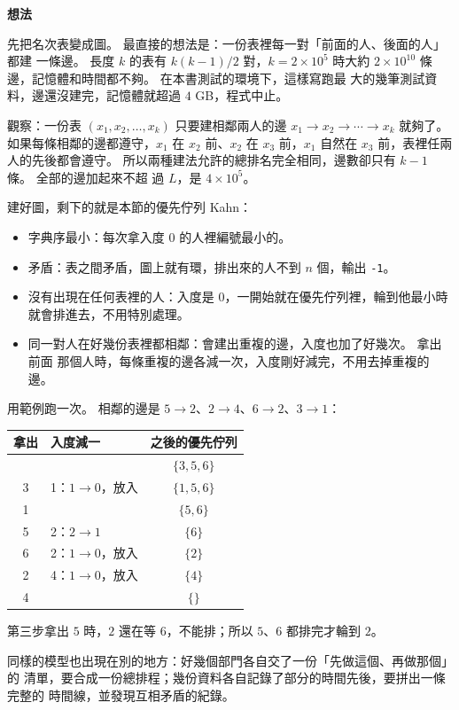 \textbf{想法}

先把名次表變成圖。 最直接的想法是：一份表裡每一對「前面的人、後面的人」都建
一條邊。 長度 $k$ 的表有 $k(k - 1)/2$ 對，$k = 2 \times 10^5$ 時大約
$2 \times 10^{10}$ 條邊，記憶體和時間都不夠。 在本書測試的環境下，這樣寫跑最
大的幾筆測試資料，邊還沒建完，記憶體就超過 $4$ GB，程式中止。

觀察：一份表 $(x_1, x_2, \ldots, x_k)$ 只要建相鄰兩人的邊
$x_1 \to x_2 \to \cdots \to x_k$ 就夠了。 如果每條相鄰的邊都遵守，$x_1$ 在
$x_2$ 前、$x_2$ 在 $x_3$ 前，$x_1$ 自然在 $x_3$ 前，表裡任兩人的先後都會遵守。
所以兩種建法允許的總排名完全相同，邊數卻只有 $k - 1$ 條。 全部的邊加起來不超
過 $L$，是 $4 \times 10^5$。

建好圖，剩下的就是本節的優先佇列 Kahn：

\begin{itemize}
\item 字典序最小：每次拿入度 $0$ 的人裡編號最小的。
\item 矛盾：表之間矛盾，圖上就有環，排出來的人不到 $n$ 個，輸出 \texttt{-1}。
\item 沒有出現在任何表裡的人：入度是 $0$，一開始就在優先佇列裡，輪到他最小時
就會排進去，不用特別處理。
\item 同一對人在好幾份表裡都相鄰：會建出重複的邊，入度也加了好幾次。 拿出前面
那個人時，每條重複的邊各減一次，入度剛好減完，不用去掉重複的邊。
\end{itemize}

用範例跑一次。 相鄰的邊是 $5 \to 2$、$2 \to 4$、$6 \to 2$、$3 \to 1$：

\begin{center}
\begin{tabular}{clc}
\toprule
拿出 & 入度減一 & 之後的優先佇列 \\
\midrule
 & & $\{3, 5, 6\}$ \\
3 & 1：$1 \to 0$，放入 & $\{1, 5, 6\}$ \\
1 & & $\{5, 6\}$ \\
5 & 2：$2 \to 1$ & $\{6\}$ \\
6 & 2：$1 \to 0$，放入 & $\{2\}$ \\
2 & 4：$1 \to 0$，放入 & $\{4\}$ \\
4 & & $\{\}$ \\
\bottomrule
\end{tabular}
\end{center}

第三步拿出 $5$ 時，$2$ 還在等 $6$，不能排；所以 $5$、$6$ 都排完才輪到 $2$。

同樣的模型也出現在別的地方：好幾個部門各自交了一份「先做這個、再做那個」的
清單，要合成一份總排程；幾份資料各自記錄了部分的時間先後，要拼出一條完整的
時間線，並發現互相矛盾的紀錄。


